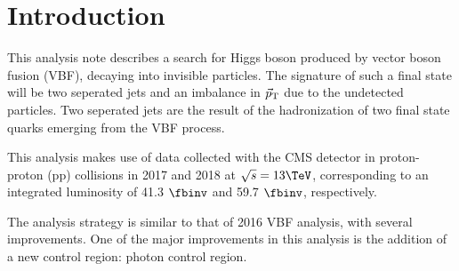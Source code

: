 \section{Introduction} \label{section:introduction}

This analysis note describes a search for Higgs boson produced by vector boson fusion (VBF), 
decaying into invisible particles. The signature of such a final state will be two seperated jets 
and an imbalance in $\vec{p}_{\rm T}$ due to the undetected particles. Two seperated jets are the result of the 
hadronization of two final state quarks emerging from the VBF process.

This analysis makes use of data collected with the CMS detector in proton-proton (pp) collisions in 2017 
and 2018 at $\sqrt{s}=13\TeV$, corresponding to an integrated luminosity of 41.3 $\fbinv$ and 59.7 $\fbinv$, 
respectively. 

The analysis strategy is similar to that of 2016 VBF analysis, with several improvements. One of the major 
improvements in this analysis is the addition of a new control region: photon control region. %
